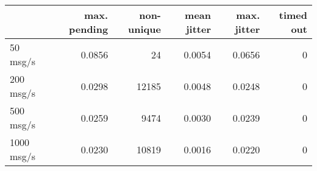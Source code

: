 \begin{tabular}{l|rrrrr}
\rowcolor{gray!50}
 & max. pending & non-unique & mean jitter & max. jitter & timed out\\\hline
50 msg/s & 0.0856 & 24 & 0.0054 & 0.0656 & 0 \\
200 msg/s & 0.0298 & 12185 & 0.0048 & 0.0248 & 0 \\
500 msg/s & 0.0259 & 9474 & 0.0030 & 0.0239 & 0 \\
1000 msg/s & 0.0230 & 10819 & 0.0016 & 0.0220 & 0 \\
\end{tabular}
